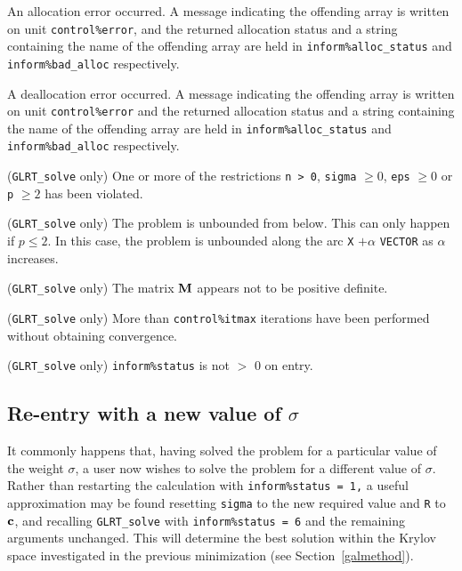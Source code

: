 \documentclass{galahad}
\newcommand{\packagename}{GL\-RT}
\begin{document}
\begin{description}
  An allocation error occurred. A message indicating
the offending
array is written on unit {\tt control\%error}, and the returned allocation
status and a string containing the name of the offending array
are held in {\tt inform\%alloc\_\-status}
and {\tt inform\%bad\_alloc} respectively.

 A deallocation error occurred.
A message indicating the offending
array is written on unit {\tt control\%error} and the returned allocation
status and a string containing the name of the offending array
are held in {\tt inform\%alloc\_\-status}
and {\tt inform\%bad\_alloc} respectively.

 ({\tt \packagename\_solve} only)
One or more of the restrictions
{\tt n > 0}, {\tt sigma} $\geq 0$, {\tt eps} $\geq 0$ or {\tt p} $\geq 2$
has been violated.

 ({\tt \packagename\_solve} only) The problem is unbounded
from below. This can only happen if $p \leq 2$. In this case, the
problem is unbounded along the arc {\tt X} $+\alpha$ {\tt VECTOR} as
$\alpha$ increases.

 ({\tt \packagename\_solve} only)
The matrix ${\mathbf{M}}$ appears not to be positive definite.

 ({\tt \packagename\_solve} only) More than
{\tt control\%itmax} iterations have been performed without obtaining
convergence.

 ({\tt \packagename\_solve} only)  {\tt inform\%status} is
not $>$ 0 on entry.

\end{description}


\subsection{Re-entry with a new value of $\sigma$}
It commonly happens that, having solved the problem for a particular value
of the weight $\sigma$, a user now wishes to solve the problem for a different
value of $\sigma$. Rather than restarting the calculation with
{\tt inform\%status = 1,} a useful approximation may be found
resetting {\tt sigma} to the new required value and {\tt R} to ${\mathbf{c}}$,
and recalling {\tt \packagename\_solve}
with {\tt inform\%status = 6} and the remaining arguments unchanged.
This will determine the best solution within the Krylov space investigated
in the previous minimization (see Section~\ref{galmethod}).
\end{document}
